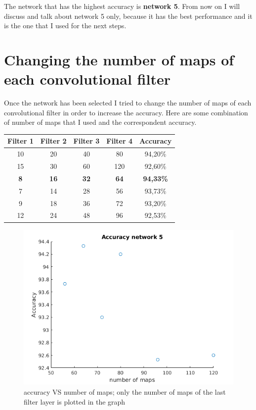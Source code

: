 \documentclass[]{report}
\begin{document}
\newpage
The network that has the highest accuracy is \textbf{network 5}. From now on I will discuss and talk about network 5 only, because it has the best performance and it is the one that I used for the next steps. 

\section{Changing the number of maps of each convolutional filter}

Once the network has been selected I tried to change the number of maps of each convolutional filter in order to increase the accuracy. Here are some combination of number of maps that I used and the correspondent accuracy.

\begin{table} [h]
\begin{center}
\begin{tabular}{|c|c|c|c|c|}
 \hline
 \textbf{Filter 1} & \textbf{Filter 2} & \textbf{Filter 3} & \textbf{Filter 4} & \textbf{Accuracy} \\ \hline
 10 & 20 & 40  & 80  & 94,20\%  \\ \hline
 15 & 30 & 60  & 120  & 92,60\%  \\ \hline
 \textbf{8} & \textbf{16} & \textbf{32}  & \textbf{64}  & \textbf{94,33\%}  \\ \hline
 7 & 14 & 28  & 56  & 93,73\%  \\ \hline
 9 & 18 & 36  & 72  & 93,20\%  \\ \hline
 12 & 24 & 48  & 96  & 92,53\%  \\ \hline
 
\end{tabular}
\end{center} 
\end{table}
 
\begin{figure}[h]
	\begin{center}
		\includegraphics[scale=0.4]{maps_accuracy.png}
		\caption{accuracy VS number of maps; only the number of maps of the last filter layer is plotted in the graph}
		\label{fig:accuracyMaps}
	\end{center}
\end{figure}
\end{document}
